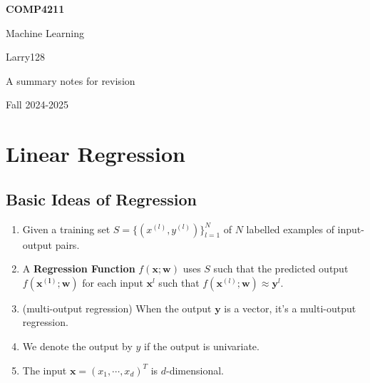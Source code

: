 \documentclass[11pt]{article}
\newcommand{\regressf}{$f(\mathbf{x}; \mathbf{w})$ }
\begin{document}
\begin{titlepage}
    \begin{center}
        \vspace*{1cm}
            
        \Huge
        \textbf{COMP4211}
            
        \vspace{0.5cm}
        \LARGE
        Machine Learning
            
        \vspace{1.5cm}
            
        Larry128
            
        \vfill
            
        A summary notes for revision
            
        \vspace{0.8cm}
                
        \Large
        Fall 2024-2025
            
    \end{center}
\end{titlepage}

\tableofcontents
\newpage

\section{Linear Regression}
\subsection{Basic Ideas of Regression}
\begin{enumerate}
\item Given a training set $S = \{(x^{(l)}, y^{(l)})\}_{l=1}^{N}$ of $N$ labelled examples of input-output pairs.
\item A \textbf{Regression Function} \regressf uses $S$ such that the predicted output $f(\mathbf{x^{(l)}}; \mathbf{w})$ for each input $\mathbf{x}^{l}$ such that $f(\mathbf{x}^{(l)}; \mathbf{w}) \approx \mathbf{y}^l$.
\item (multi-output regression) When the output $\mathbf{y}$ is a vector, it's a multi-output regression.
\item We denote the output by $y$ if the output is univariate.
\item The input $\mathbf{x} = (x_1 , \cdots, x_d) ^T$ is $d$-dimensional.
\end{enumerate}
\end{document}
